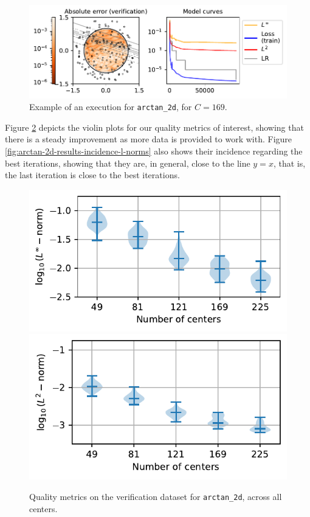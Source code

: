 \documentclass[12pt]{report} %
\begin{document}
\begin{figure}
  \includegraphics[width=\textwidth]{imagenes/experiments/2d/statistical_2d_full_scheduler_interpolation/arctan_2d/arctan_paper_2d-TR26-C169-Kgaussian_kernel-Sh3.1738-10-E77017.pdf}
  \caption{Example of an execution for \texttt{arctan\_2d}, for $C=169$.}
  \label{fig:example-execution-arctan-2d}
\end{figure}

Figure \ref{fig:violins-arctan-2d} depicts the violin plots for our quality metrics of interest, showing that there is a steady improvement as more data is provided to work with. Figure \ref{fig:arctan-2d-results-incidence-l-norms} also shows their incidence regarding the best iterations, showing that they are, in general, close to the line $y=x$, that is, the last iteration is close to the best iterations.

\begin{figure}
  \includegraphics[width=.45\textwidth]{imagenes/experiments/2d/statistical_2d_full_scheduler_interpolation/arctan_2d/violins_linf_arctan_paper_2d_endgame.pdf}
  \includegraphics[width=.45\textwidth]{imagenes/experiments/2d/statistical_2d_full_scheduler_interpolation/arctan_2d/violins_l2_arctan_paper_2d_endgame.pdf}
  \caption{Quality metrics on the verification dataset for \texttt{arctan\_2d}, across all centers.}
  \label{fig:violins-arctan-2d}
\end{figure}
\end{document}
